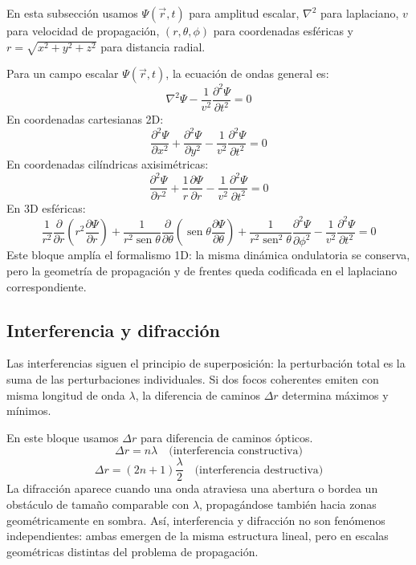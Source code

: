 \documentclass[12pt, a4paper]{article}
\theoremstyle{plain}
\theoremstyle{definition}
\theoremstyle{remark}
\newcommand{\ve}[1]{\vec{#1}}
\DeclareMathOperator{\sen}{sen}
\begin{document}
En esta subsección usamos $\Psi(\ve{r},t)$ para amplitud escalar, $\nabla^2$ para laplaciano,
$v$ para velocidad de propagación, $(r,\theta,\phi)$ para coordenadas esféricas y
$r=\sqrt{x^2+y^2+z^2}$ para distancia radial.

Para un campo escalar $\Psi(\ve{r},t)$, la ecuación de ondas general es:
\begin{equation}
  \nabla^2\Psi-\frac{1}{v^2}\frac{\partial^2\Psi}{\partial t^2}=0
\end{equation}
En coordenadas cartesianas 2D:
\begin{equation}
  \frac{\partial^2\Psi}{\partial x^2}
  +\frac{\partial^2\Psi}{\partial y^2}
  -\frac{1}{v^2}\frac{\partial^2\Psi}{\partial t^2}=0
\end{equation}
En coordenadas cilíndricas axisimétricas:
\begin{equation}
  \frac{\partial^2\Psi}{\partial r^2}
  +\frac{1}{r}\frac{\partial\Psi}{\partial r}
  -\frac{1}{v^2}\frac{\partial^2\Psi}{\partial t^2}=0
\end{equation}
En 3D esféricas:
\begin{equation}
  \frac{1}{r^2}\frac{\partial}{\partial r}\!\left(r^2\frac{\partial\Psi}{\partial r}\right)
  +\frac{1}{r^2\sen\theta}\frac{\partial}{\partial\theta}
   \!\left(\sen\theta\frac{\partial\Psi}{\partial\theta}\right)
  +\frac{1}{r^2\sen^2\theta}\frac{\partial^2\Psi}{\partial\phi^2}
  -\frac{1}{v^2}\frac{\partial^2\Psi}{\partial t^2}=0
\end{equation}
Este bloque amplía el formalismo 1D: la misma dinámica ondulatoria se conserva, pero la
geometría de propagación y de frentes queda codificada en el laplaciano correspondiente.
\subsection{Interferencia y difracción}

Las interferencias siguen el principio de superposición: la perturbación total es la suma de
las perturbaciones individuales. Si dos focos coherentes emiten con misma longitud de onda
$\lambda$, la diferencia de caminos $\Delta r$ determina máximos y mínimos.

En este bloque usamos $\Delta r$ para diferencia de caminos ópticos.
\begin{equation}
  \Delta r = n\lambda \quad\text{(interferencia constructiva)}
\end{equation}
\begin{equation}
  \Delta r = \left(2n+1\right)\frac{\lambda}{2}
  \quad\text{(interferencia destructiva)}
\end{equation}
La difracción aparece cuando una onda atraviesa una abertura o bordea un obstáculo de tamaño
comparable con $\lambda$, propagándose también hacia zonas geométricamente en sombra.
Así, interferencia y difracción no son fenómenos independientes: ambas emergen de la misma
estructura lineal, pero en escalas geométricas distintas del problema de propagación.
\end{document}
